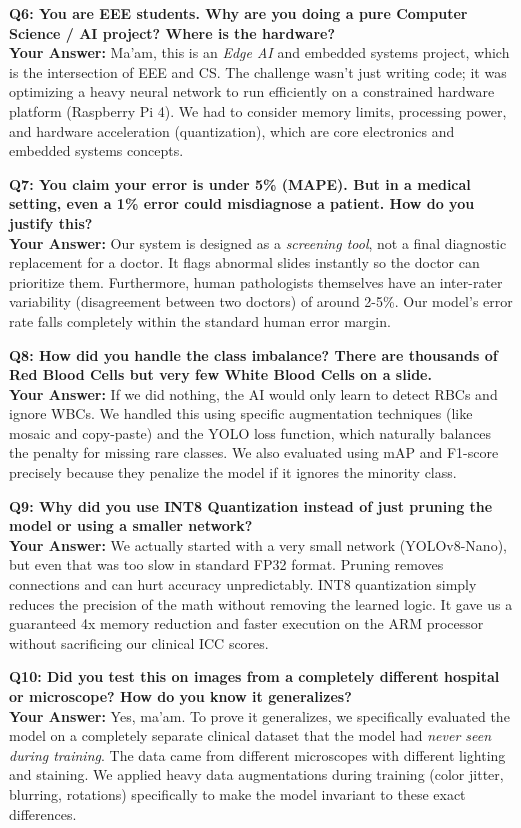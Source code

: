 \documentclass[12pt]{article}
\begin{document}
\textbf{Q6: You are EEE students. Why are you doing a pure Computer Science / AI project? Where is the hardware?} \\
\textbf{Your Answer:} Ma'am, this is an \textit{Edge AI} and embedded systems project, which is the intersection of EEE and CS. The challenge wasn't just writing code; it was optimizing a heavy neural network to run efficiently on a constrained hardware platform (Raspberry Pi 4). We had to consider memory limits, processing power, and hardware acceleration (quantization), which are core electronics and embedded systems concepts.

\textbf{Q7: You claim your error is under 5\% (MAPE). But in a medical setting, even a 1\% error could misdiagnose a patient. How do you justify this?} \\
\textbf{Your Answer:} Our system is designed as a \textit{screening tool}, not a final diagnostic replacement for a doctor. It flags abnormal slides instantly so the doctor can prioritize them. Furthermore, human pathologists themselves have an inter-rater variability (disagreement between two doctors) of around 2-5\%. Our model's error rate falls completely within the standard human error margin.

\textbf{Q8: How did you handle the class imbalance? There are thousands of Red Blood Cells but very few White Blood Cells on a slide.} \\
\textbf{Your Answer:} If we did nothing, the AI would only learn to detect RBCs and ignore WBCs. We handled this using specific augmentation techniques (like mosaic and copy-paste) and the YOLO loss function, which naturally balances the penalty for missing rare classes. We also evaluated using mAP and F1-score precisely because they penalize the model if it ignores the minority class.

\textbf{Q9: Why did you use INT8 Quantization instead of just pruning the model or using a smaller network?} \\
\textbf{Your Answer:} We actually started with a very small network (YOLOv8-Nano), but even that was too slow in standard FP32 format. Pruning removes connections and can hurt accuracy unpredictably. INT8 quantization simply reduces the precision of the math without removing the learned logic. It gave us a guaranteed 4x memory reduction and faster execution on the ARM processor without sacrificing our clinical ICC scores.

\textbf{Q10: Did you test this on images from a completely different hospital or microscope? How do you know it generalizes?} \\
\textbf{Your Answer:} Yes, ma'am. To prove it generalizes, we specifically evaluated the model on a completely separate clinical dataset that the model had \textit{never seen during training}. The data came from different microscopes with different lighting and staining. We applied heavy data augmentations during training (color jitter, blurring, rotations) specifically to make the model invariant to these exact differences.
\end{document}
